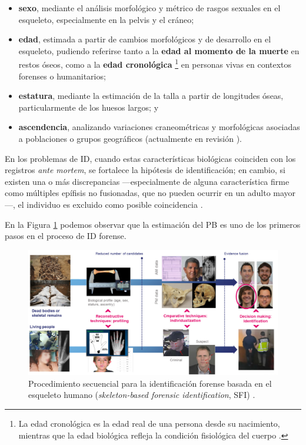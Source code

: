 \begin{itemize}
    \item \textbf{sexo}, mediante el análisis morfológico y métrico de rasgos sexuales en el esqueleto, 
    especialmente en la pelvis y el cráneo;
    \item \textbf{edad}, estimada a partir de cambios morfológicos y de desarrollo en el esqueleto, pudiendo 
    referirse tanto a la \textbf{edad al momento de la muerte} en restos óseos, como a la \textbf{edad cronológica} 
    \footnote{La edad cronológica es la edad real de una persona desde su nacimiento, mientras que la edad
    biológica refleja la condición fisiológica del cuerpo \cite{marcante2025}.}
    en personas vivas en contextos forenses o humanitarios;
    \item \textbf{estatura}, mediante la estimación de la talla a partir de longitudes óseas, particularmente 
    de los huesos largos; y
    \item \textbf{ascendencia}, analizando variaciones craneométricas y morfológicas asociadas a poblaciones 
    o grupos geográficos (actualmente en revisión \cite{ross2021a, ross2021b, flouri2022}).
\end{itemize}

En los problemas de ID, cuando estas características biológicas coinciden con los registros \textit{ante mortem}, 
se fortalece la hipótesis de identificación; en cambio, si existen una o más discrepancias ---especialmente de 
alguna característica firme como múltiples epífisis no fusionadas, que no pueden ocurrir en un adulto mayor---, 
el individuo es excluido como posible coincidencia \cite{byers2023}. %

En la Figura \ref{fig:SFI_pipeline} podemos observar que la estimación del PB es uno de los primeros pasos en 
el proceso de ID forense. 

\begin{figure}[h]
    \centering
    \includegraphics[width=\textwidth]{capitulos/cap_01/imagenes/SFI_pipeline.png}
    \caption{Procedimiento secuencial para la identificación forense basada en el esqueleto humano 
            (\textit{skeleton-based forensic identification}, SFI) \cite{mesejo2020}.} 
    \label{fig:SFI_pipeline}
\end{figure}

